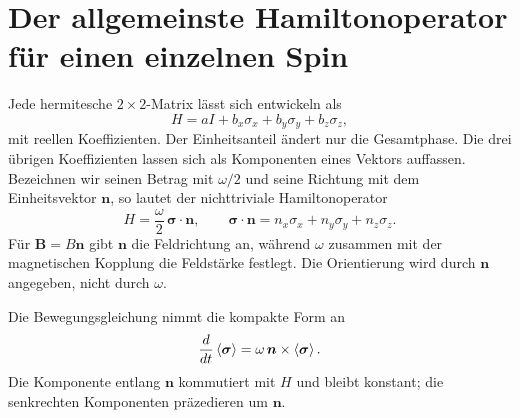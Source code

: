 \section{Der allgemeinste Hamiltonoperator für einen einzelnen Spin}

Jede hermitesche \(2\times2\)-Matrix lässt sich entwickeln als
\begin{equation}
H=aI+b_x\sigma_x+b_y\sigma_y+b_z\sigma_z,
\end{equation}
mit reellen Koeffizienten. Der Einheitsanteil ändert nur die Gesamtphase. Die drei übrigen Koeffizienten lassen sich als Komponenten eines Vektors auffassen. Bezeichnen wir seinen Betrag mit \(\omega/2\) und seine Richtung mit dem Einheitsvektor \(\bm n\), so lautet der nichttriviale Hamiltonoperator
\begin{equation}
H=\frac{\omega}{2}\,\bm\sigma\cdot\bm n,
\qquad
\bm\sigma\cdot\bm n
=n_x\sigma_x+n_y\sigma_y+n_z\sigma_z.
\label{eq:l5-general-spin-h}
\end{equation}
Für \(\bm B=B\bm n\) gibt \(\bm n\) die Feldrichtung an, während \(\omega\) zusammen mit der magnetischen Kopplung die Feldstärke festlegt. Die Orientierung wird durch \(\bm n\) angegeben, nicht durch \(\omega\).

Die Bewegungsgleichung nimmt die kompakte Form an
\begin{equation}
\frac{d}{dt}\left\langle\bm\sigma\right\rangle
=\omega\,\bm n\times\left\langle\bm\sigma\right\rangle.
\end{equation}
Die Komponente entlang \(\bm n\) kommutiert mit \(H\) und bleibt konstant; die senkrechten Komponenten präzedieren um \(\bm n\).

\begin{classroomqa}\end{classroomqa}

\begin{classroomqa}\end{classroomqa}

